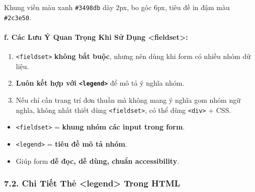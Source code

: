\documentclass[11pt,oneside]{book}
\newcommand{\codeinline}[1]{\textcolor{accentOrange}{\texttt{#1}}}
\begin{document}
\begin{browserWindow}
\begin{tcolorbox}[
    enhanced, colback=white, colframe=primaryBlue, boxrule=1.5pt, arc=6pt,
    top=10pt, bottom=10pt, left=10pt, right=10pt,
    coltitle=darkText,
    title={\sffamily\bfseries\color{darkText} Thông tin cá nhân},
    attach boxed title to top left={xshift=12pt, yshift=-7pt},
    boxed title style={colback=white, colframe=white, boxrule=0pt, left=4pt, right=4pt, top=0pt, bottom=0pt}
]
\sffamily\small
\textcolor{darkText}{Khung viền màu xanh \codeinline{\#3498db} dày 2px, bo góc 6px, tiêu đề in đậm màu \codeinline{\#2c3e50}.}
\end{tcolorbox}
\end{browserWindow}

\paragraph{f. Các Lưu Ý Quan Trọng Khi Sử Dụng <fieldset>:}
\begin{enumerate}[leftmargin=1.5em, itemsep=3pt, parsep=0pt]
    \item \codeinline{<fieldset>} \textbf{không bắt buộc}, nhưng nên dùng khi form có nhiều nhóm dữ liệu.
    \item \textbf{Luôn kết hợp với \codeinline{<legend>}} để mô tả ý nghĩa nhóm.
    \item Nếu chỉ cần trang trí đơn thuần mà không mang ý nghĩa gom nhóm ngữ nghĩa, không nhất thiết dùng \codeinline{<fieldset>}, có thể dùng \codeinline{<div>} + CSS.
\end{enumerate}

\begin{tipBox}
\begin{itemize}[leftmargin=1.5em, itemsep=2pt, parsep=0pt]
    \item \codeinline{<fieldset>} = \textbf{khung nhóm các input trong form}.
    \item \codeinline{<legend>} = \textbf{tiêu đề mô tả nhóm}.
    \item Giúp form \textbf{dễ đọc, dễ dùng, chuẩn accessibility}.
\end{itemize}
\end{tipBox}

\subsubsection{7.2. Chi Tiết Thẻ <legend> Trong HTML}
\end{document}
